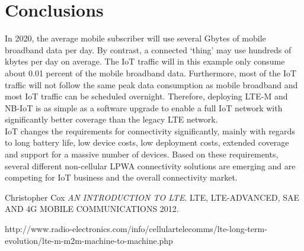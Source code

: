 \documentclass[12pt]{article}
\begin{document}
\pagebreak
\section{Conclusions}\label{conclusions}
In 2020, the average mobile subscriber will use several Gbytes of mobile broadband data per day. By contrast, a connected ‘thing’ may use hundreds of kbytes per day on average. The IoT traffic will in this example only consume about 0.01 percent of the mobile broadband data. Furthermore, most of the IoT traffic will not follow the same peak data consumption as mobile broadband and most IoT traffic can be scheduled overnight. Therefore, deploying LTE-M and NB-IoT is as simple as a software upgrade to enable a full IoT network with significantly better coverage than the legacy LTE network.\\
IoT changes the requirements for connectivity significantly, mainly with regards to long battery life, low
device costs, low deployment costs, extended coverage and support for a massive number of devices.
Based on these requirements, several different non-cellular LPWA connectivity solutions are emerging and
are competing for IoT business and the overall connectivity market. 

\pagebreak
\begin{thebibliography}{9}
Christopher Cox
\textit{AN INTRODUCTION
TO LTE}.
LTE, LTE-ADVANCED, SAE
AND 4G MOBILE COMMUNICATIONS 2012.

\bibitem http://www.radio-electronics.com/info/cellulartelecomms/lte-long-term-evolution/lte-m-m2m-machine-to-machine.php
\end{thebibliography}
\end{document}
